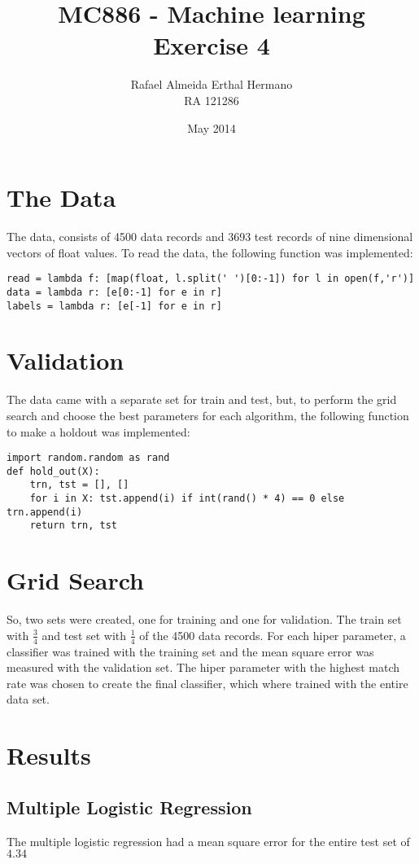 \documentclass{article}
\title{MC886 - Machine learning \\ Exercise 4}
\author{Rafael Almeida Erthal Hermano\\RA 121286}
\date{May 2014}
\begin{document}
\maketitle
\newpage

\section{The Data}
The data, consists of 4500 data records and 3693 test records of nine dimensional vectors of float values. To read the data, the following function was implemented:

\begin{lstlisting}
read = lambda f: [map(float, l.split(' ')[0:-1]) for l in open(f,'r')]
data = lambda r: [e[0:-1] for e in r]
labels = lambda r: [e[-1] for e in r]
\end{lstlisting}

\section{Validation}
The data came with a separate set for train and test, but, to perform the grid search and choose the best parameters for each algorithm, the following function to make a holdout was implemented:

\begin{lstlisting}
import random.random as rand
def hold_out(X):
    trn, tst = [], []
    for i in X: tst.append(i) if int(rand() * 4) == 0 else trn.append(i)
    return trn, tst
\end{lstlisting}

\section{Grid Search}
So, two sets were created, one for training and one for validation. The train set with $\frac{3}{4}$ and test set with $\frac{1}{4}$ of the 4500 data records. For each hiper parameter, a classifier was trained with the training set and the mean square error was measured with the validation set. The hiper parameter with the highest match rate was chosen to create the final classifier, which where trained with the entire data set.

\section{Results}
\subsection{Multiple Logistic Regression}
The multiple logistic regression had a mean square error for the entire test set of $4.34$
\end{document}
